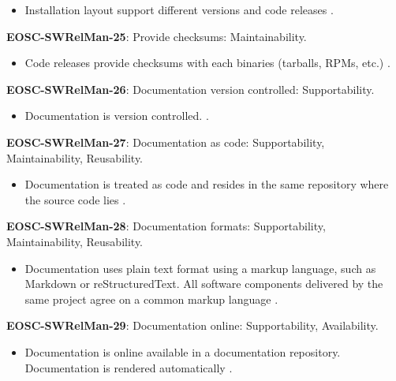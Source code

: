 \begin{itemize}
    \item Installation layout support different versions and code releases \cite{raymond_software_2013}.
\end{itemize}

\textbf{EOSC-SWRelMan-25}: Provide checksums: Maintainability.

\begin{itemize}
    \item Code releases provide checksums with each binaries (tarballs, RPMs, etc.) \cite{raymond_software_2013}.
\end{itemize}

\textbf{EOSC-SWRelMan-26}: Documentation version controlled: Supportability.

\begin{itemize}
    \item Documentation is version controlled. \cite{orviz_fernandez_eosc-synergy_2020}.
\end{itemize}

\textbf{EOSC-SWRelMan-27}: Documentation as code: Supportability, Maintainability, Reusability.

\begin{itemize}
    \item Documentation is treated as code and resides in the same repository where the source code lies \cite{orviz_set_2017}.
\end{itemize}

\textbf{EOSC-SWRelMan-28}: Documentation formats: Supportability, Maintainability, Reusability.

\begin{itemize}
    \item Documentation uses plain text format using a markup language, such as Markdown or reStructuredText. All software components delivered by the same project agree on a common markup language \cite{orviz_set_2017,raymond_software_2013}.
\end{itemize}

\textbf{EOSC-SWRelMan-29}: Documentation online: Supportability, Availability.

\begin{itemize}
    \item Documentation is online available in a documentation repository. Documentation is rendered automatically \cite{orviz_set_2017,orviz_fernandez_eosc-synergy_2020}.
\end{itemize}


